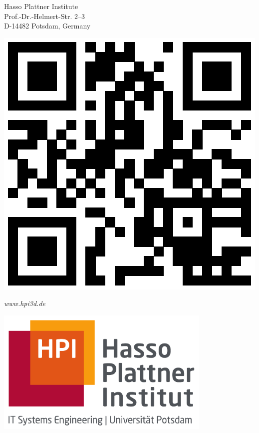 {\begin{minipage}{13.08cm}
		Hasso Plattner Institute\\
		Prof.-Dr.-Helmert-Str. 2--3\\
		D-14482 Potsdam, Germany
	\end{minipage}
	\begin{minipage}{7.13cm}
		\vspace{-0.5cm}
		\includegraphics[width=\textwidth]{./resources/qrcode_hpi3d.eps}
		\vspace{-1.6cm}
		\begin{center}
			\emph{www.hpi3d.de}
		\end{center}
	\end{minipage}
	\hfill
	\begin{minipage}{11.89cm}
		\begin{flushright}
			\includegraphics[height=6cm]{./resources/hpi_logo_cmyk_wb_sl1.pdf}

\end{flushright}
\end{minipage}}
